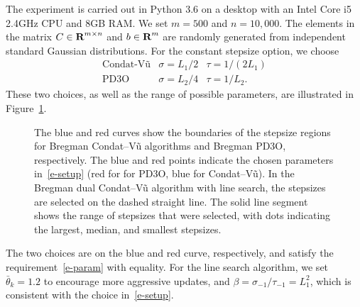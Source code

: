 \documentclass[letterpaper,11pt]{article}
\newcommand{\reals}{{\mbox{\bf R}}}
\begin{document}
The experiment is carried out in Python 3.6 on a desktop
with an Intel Core i5 2.4GHz CPU and 8GB RAM.
We set $m=500$ and $n=10,000$.
The elements in the matrix $C \in \reals^{m \times n}$
and $b \in \reals^m$ are randomly generated 
from independent standard Gaussian distributions.
For the constant stepsize option, we choose
\begin{equation} \label{e-setup}
\begin{array}{lll}
\mbox{Condat-V\~u} & \sigma=L_1/2 & \tau=1/(2L_1) \\
\mbox{PD3O} & \sigma=L_2/4 & \tau=1/L_2.
\end{array}
\end{equation} 
These two choices, as well as the range of possible parameters,
are illustrated in Figure~\ref{f-param-2}.
\begin{figure}
\centering
{}
\caption{The blue and red curves show the boundaries of the stepsize 
regions
for Bregman Condat--V\~u algorithms and Bregman PD3O, respectively.
The blue and red points indicate the chosen parameters in~\eqref{e-setup}
(red for for PD3O, blue for Condat--V\~u).
In the Bregman dual Condat--V\~u algorithm with line search,
the stepsizes are selected on the dashed straight line.  
The solid line segment shows the range of 
stepsizes that were selected, with dots indicating the largest, median, 
and smallest stepsizes.}
\label{f-param-2}
\end{figure}
The two choices are on the blue and red curve, respectively,
and satisfy the requirement~\eqref{e-param} with equality.
For the line search algorithm, we set $\bar \theta_k=1.2$ to 
encourage more aggressive updates, and $\beta=\sigma_{-1}/\tau_{-1}=L_1^2$,
which is consistent with the choice in~\eqref{e-setup}.
\end{document}
